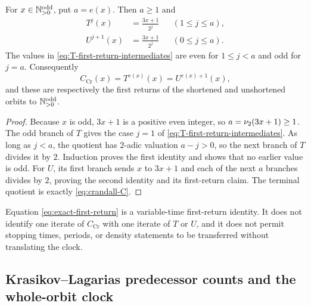 \begin{proposition}
\label{prop:first-return-clocks}
For $x\in\mathbb{N}_{>0}^{\mathrm{odd}}$, put $a=e(x)$.  Then $a\geq1$ and
\begin{align}
 T^j(x)&=\frac{3x+1}{2^j} &&(1\leq j\leq a),
 \label{eq:T-first-return-intermediates}\\
 U^{j+1}(x)&=\frac{3x+1}{2^j} &&(0\leq j\leq a).
 \label{eq:U-first-return-intermediates}
\end{align}
The values in \eqref{eq:T-first-return-intermediates} are even for
$1\leq j<a$ and odd for $j=a$.  Consequently
\begin{equation}
\label{eq:exact-first-return}
 C_{\mathrm{Cr}}(x)=T^{e(x)}(x)=U^{e(x)+1}(x),
\end{equation}
and these are respectively the first returns of the shortened and
unshortened orbits to $\mathbb{N}_{>0}^{\mathrm{odd}}$.
\end{proposition}

\begin{proof}
Because $x$ is odd, $3x+1$ is a positive even integer, so
$a=\nu_{2}(3x+1)\geq1$.  The odd branch of $T$ gives the case $j=1$ of
\eqref{eq:T-first-return-intermediates}.  As long as $j<a$, the quotient has
$2$-adic valuation $a-j>0$, so the next branch of $T$ divides it by $2$.
Induction proves the first identity and shows that no earlier value is odd.
For $U$, its first branch sends $x$ to $3x+1$ and each of the next $a$
branches divides by $2$, proving the second identity and its first-return
claim.  The terminal quotient is exactly \eqref{eq:crandall-C}.
\end{proof}

\begin{nonclaim}
Equation \eqref{eq:exact-first-return} is a variable-time first-return
identity.  It does not identify one iterate of $C_{\mathrm{Cr}}$ with one
iterate of $T$ or $U$, and it does not permit stopping times, periods, or
density statements to be transferred without translating the clock.
\end{nonclaim}

\subsection{Krasikov--Lagarias predecessor counts and the whole-orbit clock}
\label{subsec:KL-predecessor-clock}

